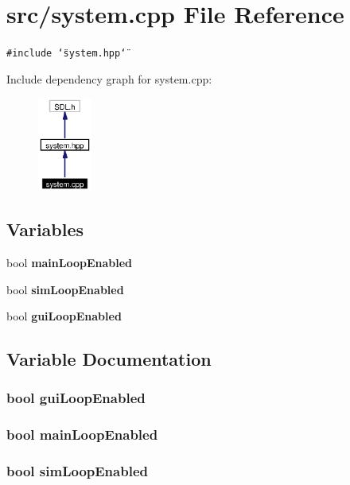 \section{src/system.cpp File Reference}
\label{system_8cpp}
{\tt \#include \char`\"{}system.hpp\char`\"{}}\par


Include dependency graph for system.cpp:\begin{figure}[H]
\begin{center}
\leavevmode
\includegraphics[width=50pt]{system_8cpp__incl}
\end{center}
\end{figure}
\subsection*{Variables}
\begin{CompactItemize}
\item 
bool {\bf main\-Loop\-Enabled}
\item 
bool {\bf sim\-Loop\-Enabled}
\item 
bool {\bf gui\-Loop\-Enabled}
\end{CompactItemize}


\subsection{Variable Documentation}
\subsubsection{\setlength{\rightskip}{0pt plus 5cm}bool {\bf gui\-Loop\-Enabled}}\label{system_8cpp_a2}


\subsubsection{\setlength{\rightskip}{0pt plus 5cm}bool {\bf main\-Loop\-Enabled}}\label{system_8cpp_a0}


\subsubsection{\setlength{\rightskip}{0pt plus 5cm}bool {\bf sim\-Loop\-Enabled}}\label{system_8cpp_a1}


